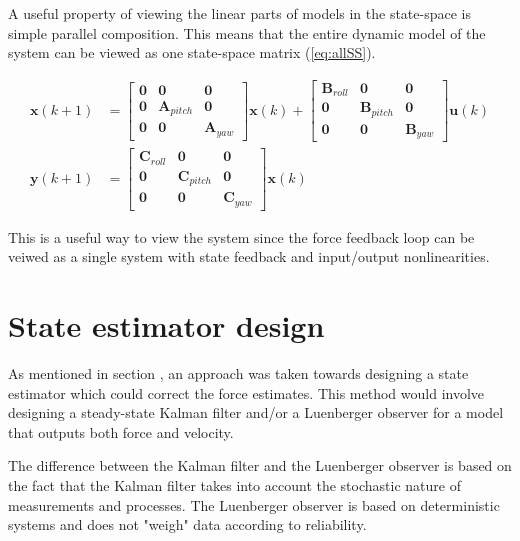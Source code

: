 A  useful property of viewing the linear parts of models in the state-space is simple parallel composition.
This means that the entire dynamic model of the system can be viewed as one state-space matrix (\ref{eq:allSS}).

\begin{align}\label{eq:allSS}
\mathbf{x}(k+1) &= 
\begin{bmatrix} \mathbf{0} & \mathbf{0} & \mathbf{0}\\
 \mathbf{0} & \mathbf{A}_{pitch} &\mathbf{0}\\
 \mathbf{0} &\mathbf{0} & \mathbf{A}_{yaw}  \end{bmatrix} 
 \mathbf{x}(k) + 
\begin{bmatrix} \mathbf{B}_{roll} & \mathbf{0} & \mathbf{0}\\
 \mathbf{0} & \mathbf{B}_{pitch} &\mathbf{0}\\
 \mathbf{0} &\mathbf{0} & \mathbf{B}_{yaw}  \end{bmatrix} 
 \mathbf{u}(k)\\
\mathbf{y}(k+1) &= 
\begin{bmatrix} \mathbf{C}_{roll} & \mathbf{0} & \mathbf{0}\\
 \mathbf{0} & \mathbf{C}_{pitch} &\mathbf{0}\\
 \mathbf{0} &\mathbf{0} & \mathbf{C}_{yaw}  \end{bmatrix} 
\mathbf{x}(k) 
\end{align}

This is a useful way to view the system since the force feedback loop can be veiwed as a single system with state feedback and input/output nonlinearities.

\section{State estimator design} \label{se:est}
As mentioned in section , an approach was taken towards designing a state estimator which could correct the force estimates.
This method would involve designing a steady-state Kalman filter \cite{brown1997introduction} and/or a Luenberger observer \cite{friedland2012control} for a model that outputs both force and velocity.

The difference between the Kalman filter and the Luenberger observer is based on the fact that the Kalman filter takes into account the stochastic nature of measurements and processes. The Luenberger observer is based on deterministic systems and does not "weigh" data according to reliability.

